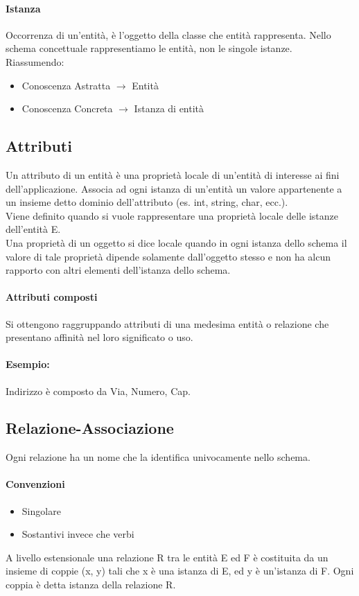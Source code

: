 \paragraph*{Istanza}
Occorrenza di un'entità, è l'oggetto della classe che entità rappresenta. Nello schema
concettuale rappresentiamo le entità, non le singole istanze.
\\ Riassumendo:
\begin{itemize}
    \item Conoscenza Astratta $\rightarrow$ Entità
    \item Conoscenza Concreta $\rightarrow$ Istanza di entità
\end{itemize}
\subsection*{Attributi}
Un attributo di un entità è una proprietà locale di un'entità di interesse ai
fini dell'applicazione. Associa ad ogni istanza di un'entità un valore appartenente
a un insieme detto dominio dell'attributo (es. int, string, char, ecc.).
\\ Viene definito quando si vuole rappresentare una proprietà locale
delle istanze dell'entità E.
\\ Una proprietà di un oggetto si dice locale quando in ogni istanza dello schema il valore
di tale proprietà dipende solamente dall'oggetto stesso e non ha alcun rapporto
con altri elementi dell'istanza dello schema.
\paragraph*{Attributi composti}
Si ottengono raggruppando attributi di una medesima entità o relazione che
presentano affinità nel loro significato o uso.
\paragraph*{Esempio:} Indirizzo è composto da Via, Numero, Cap.
\subsection*{Relazione-Associazione}
Ogni relazione ha un nome che la identifica univocamente nello schema.
\paragraph*{Convenzioni}
\begin{itemize}
    \item Singolare
    \item Sostantivi invece che verbi
\end{itemize}
A livello estensionale una relazione R tra le entità E ed F è costituita da un
insieme di coppie (x, y) tali che x è una istanza di E, ed y è un'istanza di F.
Ogni coppia è detta istanza della relazione R.
